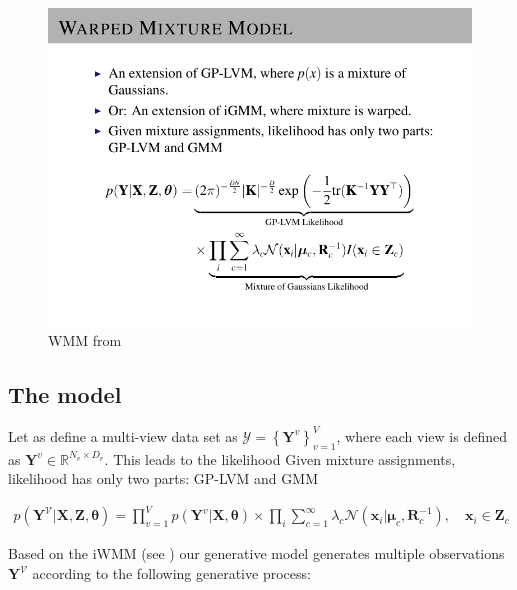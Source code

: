 \documentclass[]{article}
\newcommand{\gD}[2]{\mathcal{N}\left(#1,#2\right)}
\begin{document}
\begin{figure}[h!]
	\centering
	\includegraphics[width=.9\linewidth]{img/iwmm_talk_Model}
	\caption{WMM from \cite{IwaDuvGha2012warped}}
\end{figure}

\subsection{The model}

Let as define a multi-view data set as $\mathcal{Y}=\left\{\mathbf{Y}^{v}\right\}_{v=1}^{V}$, where each view is defined as $\mathbf{Y}^{v}\in \mathbb{R}^{N_v\times D_v}$. This leads to the likelihood Given mixture assignments, likelihood has only two parts:
GP-LVM and GMM

\begin{align}
p\left(\mathbf{Y}^{\mathcal{V}}|\mathbf{X},\mathbf{Z},\boldsymbol{\theta}\right) = \prod_{v=1}^{V}p(\mathbf{Y}^v|\mathbf{X},\boldsymbol{\theta})\times \prod_{i}\sum_{c=1}^{\infty} \lambda_c\gD{\mathbf{x}_i|\boldsymbol{\mu}_c}{\mathbf{R}_c^{-1}} ,\quad \mathbf{x}_i \in \mathbf{Z}_c
\end{align}


Based on the iWMM (see \cite{IwaDuvGha2012warped}) our generative model generates multiple observations $\mathbf{Y}^{\mathcal{V}}$ according to the following generative process:
\end{document}
